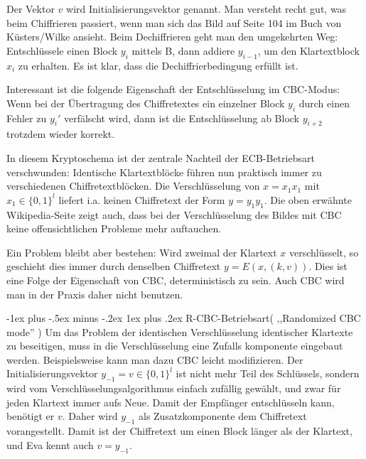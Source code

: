 \documentclass[a4paper]{article}
\makeatletter
\renewcommand{\subsubsection}{\@startsection{subsubsection}{3}{0mm}%
 {-1ex plus -.5ex minus -.2ex}%
 {1ex plus .2ex}%
 {\normalfont\small\bfseries}}
\makeatother
\begin{document}
\begin{multicols}{3}
    Der Vektor $v$ wird Initialisierungsvektor genannt. Man versteht recht gut, was beim Chiffrieren passiert, wenn man sich das Bild auf Seite 104 im Buch von Küsters/Wilke ansieht. Beim Dechiffrieren geht man den umgekehrten Weg: Entschlüssele einen Block $y_i$ mittels B, dann addiere $y_{i-1}$, um den Klartextblock $x_i$ zu erhalten. Es ist klar, dass die Dechiffrierbedingung erfüllt ist.

    Interessant ist die folgende Eigenschaft der Entschlüsselung im CBC-Modus: Wenn bei der Übertragung des Chiffretextes ein einzelner Block $y_i$ durch einen Fehler zu $y_i'$ verfälscht wird, dann ist die Entschlüsselung ab Block $y_{i+2}$ trotzdem wieder korrekt.

    In diesem Kryptoschema ist der zentrale Nachteil der ECB-Betriebsart verschwunden: Identische Klartextblöcke führen nun praktisch immer zu verschiedenen Chiffretextblöcken. Die Verschlüsselung von $x=x_1 x_1$ mit $x_1\in\{0,1\}^l$ liefert i.a. keinen Chiffretext der Form $y=y_1 y_1$. Die oben erwähnte Wikipedia-Seite zeigt auch, dass bei der Verschlüsselung des Bildes mit CBC keine offensichtlichen Probleme mehr auftauchen.

    Ein Problem bleibt aber bestehen: Wird zweimal der Klartext $x$ verschlüsselt, so geschieht dies immer durch denselben Chiffretext $y=E(x,(k,v))$. Dies ist eine Folge der Eigenschaft von CBC, deterministisch zu sein. Auch CBC wird man in der Praxis daher nicht benutzen.

    \subsubsection{R-CBC-Betriebsart( ,,Randomized CBC mode'' )}
    Um das Problem der identischen Verschlüsselung identischer Klartexte zu beseitigen, muss in die Verschlüsselung eine Zufalls komponente eingebaut werden. Beispielsweise kann man dazu CBC leicht modifizieren. Der Initialisierungsvektor $y_{-1}=v\in\{0,1\}^l$  ist nicht mehr Teil des Schlüssels, sondern wird vom Verschlüsselungsalgorithmus einfach zufällig gewählt, und zwar für jeden Klartext immer aufs Neue. Damit der Empfänger entschlüsseln kann, benötigt er $v$. Daher wird $y_{-1}$ als Zusatzkomponente dem Chiffretext vorangestellt. Damit ist der Chiffretext um einen Block länger als der Klartext, und Eva kennt auch $v=y_{-1}$.


\end{multicols}
\end{document}
